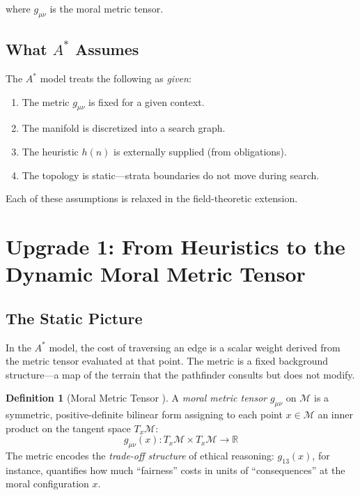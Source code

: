 \documentclass[12pt,letterpaper]{article}
\theoremstyle{definition}
\newtheorem{definition}[theorem]{Definition}
\newcommand{\R}{\mathbb{R}}
\newcommand{\calM}{\mathcal{M}}
\begin{document}
where $g_{\mu\nu}$ is the moral metric tensor.

\subsection{What $A^*$ Assumes}

The $A^*$ model treats the following as \emph{given}:
\begin{enumerate}
    \item The metric $g_{\mu\nu}$ is fixed for a given context.
    \item The manifold is discretized into a search graph.
    \item The heuristic $h(n)$ is externally supplied (from obligations).
    \item The topology is static---strata boundaries do not move during search.
\end{enumerate}

Each of these assumptions is relaxed in the field-theoretic extension.


\section{Upgrade 1: From Heuristics to the Dynamic Moral Metric Tensor}
\label{sec:metric}

\subsection{The Static Picture}

In the $A^*$ model, the cost of traversing an edge is a scalar weight derived from the metric tensor evaluated at that point. The metric is a fixed background structure---a map of the terrain that the pathfinder consults but does not modify.

\begin{definition}[Moral Metric Tensor {\cite[Ch.~6]{bond2026ge}}]
A \emph{moral metric tensor} $g_{\mu\nu}$ on $\calM$ is a symmetric, positive-definite bilinear form assigning to each point $x \in \calM$ an inner product on the tangent space $T_x\calM$:
\[
g_{\mu\nu}(x): T_x\calM \times T_x\calM \to \R
\]
The metric encodes the \emph{trade-off structure} of ethical reasoning: $g_{13}(x)$, for instance, quantifies how much ``fairness'' costs in units of ``consequences'' at the moral configuration $x$.
\end{definition}
\end{document}
